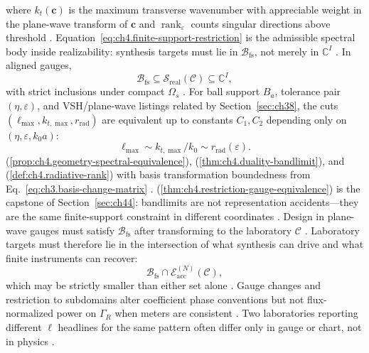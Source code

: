 where \(k_{t}(\mathbf{c})\) is the maximum transverse wavenumber with appreciable weight in the plane-wave transform of
\(\mathbf{c}\) and \(\operatorname{rank}_{\varepsilon}\) counts singular directions above threshold
\cite{hansen1988}.
Equation~\eqref{eq:ch4.finite-support-restriction} is the admissible spectral body inside realizability: synthesis
targets must lie in \(\mathcal{B}_{\mathrm{fs}}\), not merely in \(\mathbb{C}^{I}\) \cite{stratton1941}.
In aligned gauges,
\begin{equation}
\label{eq:ch4.restriction-inclusion}
\mathcal{B}_{\mathrm{fs}}
\subseteq
\mathcal{S}_{\mathrm{real}}(\mathcal{C})
\subseteq
\mathbb{C}^{I},
\end{equation}
with strict inclusions under compact \(\Omega_{s}\) \cite{hansen1988}.
\label{thm:ch4.restriction-gauge-equivalence}
For ball support \(B_{a}\), tolerance pair \((\eta,\varepsilon)\), and VSH/plane-wave listings related by
Section~\ref{sec:ch38}, the cuts \((\ell_{\max},k_{t,\max},r_{\mathrm{rad}})\) are equivalent up to constants
\(C_{1},C_{2}\) depending only on \((\eta,\varepsilon,k_{0}a)\):
\begin{equation}
\label{eq:ch4.gauge-equivalence}
\ell_{\max}\sim k_{t,\max}/k_{0}
\sim
r_{\mathrm{rad}}(\varepsilon).
\end{equation}
(\ref{prop:ch4.geometry-spectral-equivalence}), (\ref{thm:ch4.duality-bandlimit}), and
(\ref{def:ch4.radiative-rank}) with basis transformation boundedness from
Eq.~\eqref{eq:ch3.basis-change-matrix} \cite{hansen1988}.
(\ref{thm:ch4.restriction-gauge-equivalence}) is the capstone of Section~\ref{sec:ch44}: bandlimits are not
representation accidents---they are the same finite-support constraint in different coordinates
\cite{devaney2004}. Design in plane-wave gauges must satisfy \(\mathcal{B}_{\mathrm{fs}}\) after
transforming to the laboratory \(\mathcal{C}\) \cite{harrington2001}.
Laboratory targets must therefore lie in the intersection of what synthesis can drive and what finite instruments can recover:
\begin{equation}
\label{eq:ch4.realizable-accessible-intersection}
\mathcal{B}_{\mathrm{fs}}\cap\mathcal{E}_{\mathrm{acc}}^{(N)}(\mathcal{C}),
\end{equation}
which may be strictly smaller than either set alone \cite{devaney2004}.
Gauge changes and restriction to subdomains alter coefficient phase conventions but not flux-normalized power on $\Gamma_R$ when meters are consistent \cite{belinfante1940}. Two laboratories reporting different $\ell$ headlines for the same pattern often differ only in gauge or chart, not in physics \cite{hansen1988}.
